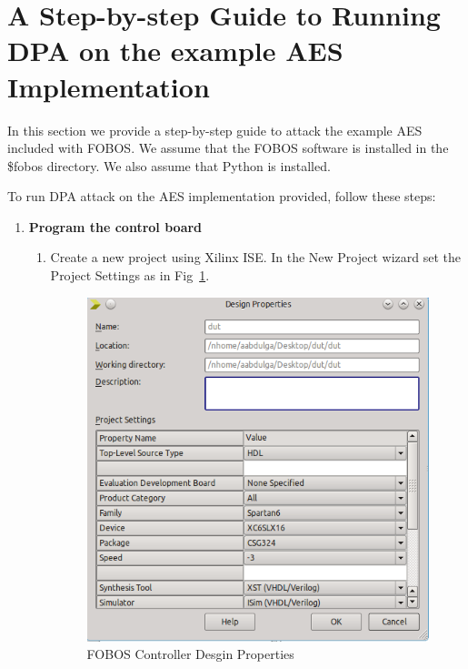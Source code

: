 \section{A Step-by-step Guide to Running DPA on the example AES Implementation}

In this section we provide a step-by-step guide to attack the example AES included with FOBOS. We assume that the FOBOS software is installed in the \$fobos directory.
We also assume that Python is installed.

To run DPA attack on the AES implementation provided, follow these steps:
\begin{enumerate}
\item \textbf{Program the control board}
  \begin{enumerate}
  \item Create a new project using Xilinx ISE. In the New Project wizard set the Project Settings as in Fig~\ref{fig:ctrl-design-properties}.
  		\begin{figure}[H]
		\begin{center}
		\includegraphics[scale=0.6]{figures/ctrl-design-properties}
		\caption{\label{fig:ctrl-design-properties}FOBOS Controller Desgin Properties}
		\end{center}
		\vspace{-1ex}
		\end{figure}

\end{enumerate}
\end{enumerate}
